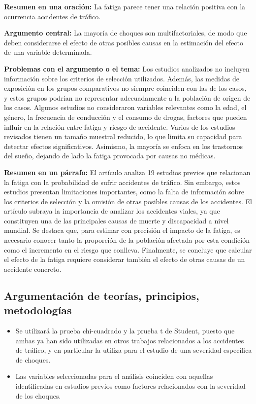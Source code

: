 \documentclass{book}
\begin{document}
\textbf{Resumen en una oración:} La fatiga parece tener una relación positiva con la ocurrencia accidentes de tráfico.

\textbf{Argumento central:} La mayoría de choques son multifactoriales, de modo que deben considerarse el efecto de otras posibles causas en la estimación del efecto de una variable determinada.

\textbf{Problemas con el argumento o el tema:} Los estudios analizados no incluyen información sobre los criterios de selección utilizados. Además, las medidas de exposición en los grupos comparativos no siempre coinciden con las de los casos, y estos grupos podrían no representar adecuadamente a la población de origen de los casos. Algunos estudios no consideraron variables relevantes como la edad, el género, la frecuencia de conducción y el consumo de drogas, factores que pueden influir en la relación entre fatiga y riesgo de accidente. Varios de los estudios revisados tienen un tamaño muestral reducido, lo que limita su capacidad para detectar efectos significativos. Asimismo, la mayoría se enfoca en los trastornos del sueño, dejando de lado la fatiga provocada por causas no médicas.

\textbf{Resumen en un párrafo:} El artículo analiza 19 estudios previos que relacionan la fatiga con la probabilidad de sufrir accidentes de tráfico. Sin embargo, estos estudios presentan limitaciones importantes, como la falta de información sobre los criterios de selección y la omisión de otras posibles causas de los accidentes. El artículo subraya la importancia de analizar los accidentes viales, ya que constituyen una de las principales causas de muerte y discapacidad a nivel mundial. Se destaca que, para estimar con precisión el impacto de la fatiga, es necesario conocer tanto la proporción de la población afectada por esta condición como el incremento en el riesgo que conlleva. Finalmente, se concluye que calcular el efecto de la fatiga requiere considerar también el efecto de otras causas de un accidente concreto.




\subsection{Argumentación de teorías, principios, metodologías}
\begin{itemize}
    \item Se utilizará la prueba chi-cuadrado y la prueba t de Student, puesto que ambas ya han sido utilizadas en otros trabajos relacionados a los accidentes de tráfico, y en particular \cite{GUNJAN2005} la utiliza para el estudio de una severidad específica de choques.
    \item Las variables seleccionadas para el análisis coinciden con aquellas identificadas en estudios previos como factores relacionados con la severidad de los choques.
\end{itemize}
\end{document}
